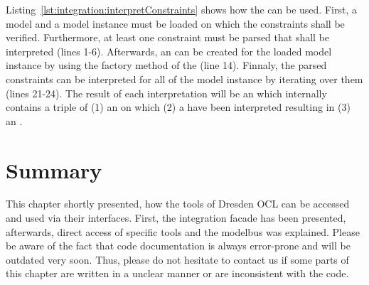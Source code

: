 Listing~\ref{lst:integration:interpretConstraints} shows how the 
 can be used. First, a model and a model instance must be 
loaded on which the constraints shall be verified. Furthermore, at least one 
constraint must be parsed that shall be interpreted (lines 1-6). Afterwards, an
 can be created for the loaded model instance by using 
the factory method of the  (line 14). Finnaly, the 
parsed constraints can be interpreted for all  of 
the model instance by iterating over them (lines 21-24). The result of each 
interpretation will be an  which internally contains
a triple of (1) an  on which (2) a  
have been interpreted resulting in (3) an .



\section{Summary}

This chapter shortly presented, how the tools of Dresden OCL can be accessed and
used via their interfaces. First, the integration facade has been presented, 
afterwards, direct access of specific tools and the modelbus was explained.
Please be aware of the fact that code documentation is always error-prone and
will be outdated very soon. Thus, please do not hesitate to contact us if some
parts of this chapter are written in a unclear manner or are inconsistent with
the code.
